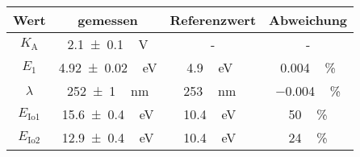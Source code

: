 \label{tab:Ergebnisse}
	\begin{tabular}{c ccc}
		\toprule
		{Wert}&{gemessen}&{Referenzwert}&{Abweichung} \\
		\midrule
		$K_\text{A}$ & \SI{2.1\pm0.1}\,\si{\volt} & - & - \\
		$E_\text{1}$ & \SI{4.92\pm0.02}\,\si{\eV} & \SI{4.9}\,\si{\eV} \cite{HgEV} & \SI{0.004}\,\si{\percent} \\
		$\lambda$ & \SI{252\pm1}\,\si{\nano\metre} & \SI{253}\,\si{\nano\metre} \cite{HgEV} & \SI{-0.004}\,\si{\percent} \\
		$E_\text{Io1}$ & \SI{15.6\pm0.4}\,\si{\eV} & \SI{10.4}\,\si{\eV} \cite{nistgovHg}& \SI{50}\,\si{\percent} \\
		$E_\text{Io2}$ & \SI{12.9\pm0.4}\,\si{\eV} & \SI{10.4}\,\si{\eV} \cite{nistgovHg}& \SI{24}\,\si{\percent} \\
		\bottomrule
	\end{tabular}
